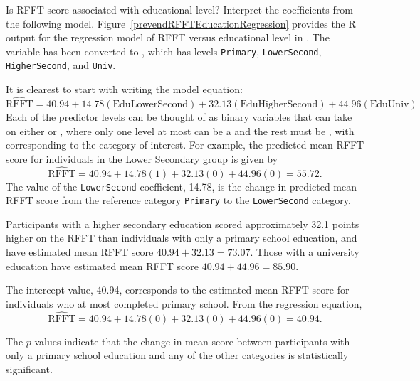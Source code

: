 \begin{examplewrap}
\begin{nexample}{Is RFFT score associated with educational level? Interpret the coefficients from the following model. Figure~\ref{prevendRFFTEducationRegression} provides the \textsf{R} output for the regression model of RFFT versus educational level in . The variable  has been converted to , which has levels \texttt{Primary}, \texttt{LowerSecond}, \texttt{HigherSecond}, and \texttt{Univ}.}

It is clearest to start with writing the model equation:
\[\widehat{\text{RFFT}} =  40.94 + 14.78(\text{EduLowerSecond}) + 32.13(\text{EduHigherSecond}) + 44.96(\text{EduUniv})\]
Each of the predictor levels can be thought of as binary variables that can take on either  or , where only one level at most can be a  and the rest must be , with  corresponding to the category of interest. For example, the predicted mean RFFT score for individuals in the Lower Secondary group is given by
\[\widehat{\text{RFFT}} =  40.94 + 14.78(1) + 32.13(0) + 44.96(0) = 55.72. \]
The value of the \texttt{LowerSecond} coefficient, 14.78, is the change in predicted mean RFFT score from the reference category \texttt{Primary} to the \texttt{LowerSecond} category. 

Participants with a higher secondary education scored approximately 32.1 points higher on the RFFT than individuals with only a primary school education, and have estimated mean RFFT score $40.94 + 32.13 = 73.07.$ Those with a university education have estimated mean RFFT score $40.94 + 44.96 = 85.90$.  

The intercept value, 40.94, corresponds to the estimated mean RFFT score for individuals who at most completed primary school. From the regression equation, 
\[\widehat{\text{RFFT}} =  40.94 + 14.78(0) + 32.13(0) + 44.96(0) = 40.94. \]

The $p$-values indicate that the change in mean score between participants with only a primary school education and any of the other categories is statistically significant.
\end{nexample}
\end{examplewrap}

